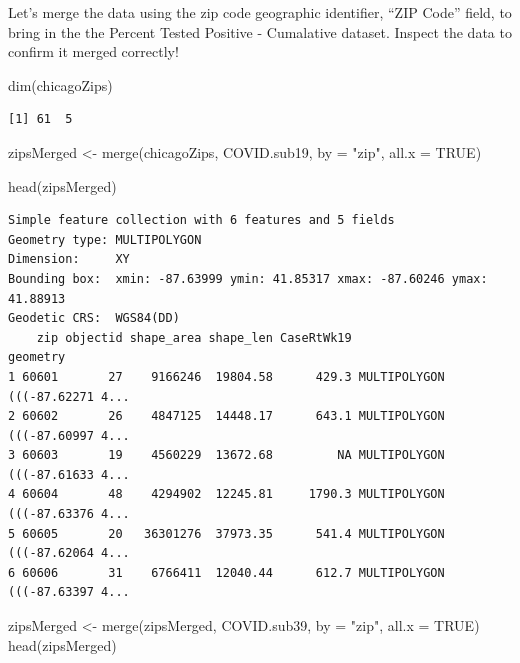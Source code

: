 \documentclass[
  letterpaper,
  DIV=11,
  numbers=noendperiod]{scrreprt}
\newenvironment{Shaded}{\begin{snugshade}}{\end{snugshade}}
\newcommand{\AttributeTok}[1]{\textcolor[rgb]{0.40,0.45,0.13}{#1}}
\newcommand{\ConstantTok}[1]{\textcolor[rgb]{0.56,0.35,0.01}{#1}}
\newcommand{\FunctionTok}[1]{\textcolor[rgb]{0.28,0.35,0.67}{#1}}
\newcommand{\NormalTok}[1]{\textcolor[rgb]{0.00,0.23,0.31}{#1}}
\newcommand{\OtherTok}[1]{\textcolor[rgb]{0.00,0.23,0.31}{#1}}
\newcommand{\StringTok}[1]{\textcolor[rgb]{0.13,0.47,0.30}{#1}}
\begin{document}
Let's merge the data using the zip code geographic identifier, ``ZIP
Code'' field, to bring in the the Percent Tested Positive - Cumalative
dataset. Inspect the data to confirm it merged correctly!

\begin{Shaded}
\begin{Highlighting}[]
\FunctionTok{dim}\NormalTok{(chicagoZips)}
\end{Highlighting}
\end{Shaded}

\begin{verbatim}
[1] 61  5
\end{verbatim}

\begin{Shaded}
\begin{Highlighting}[]
\NormalTok{zipsMerged }\OtherTok{\textless{}{-}} \FunctionTok{merge}\NormalTok{(chicagoZips, COVID.sub19, }\AttributeTok{by =} \StringTok{"zip"}\NormalTok{, }\AttributeTok{all.x =} \ConstantTok{TRUE}\NormalTok{)}

\FunctionTok{head}\NormalTok{(zipsMerged)}
\end{Highlighting}
\end{Shaded}

\begin{verbatim}
Simple feature collection with 6 features and 5 fields
Geometry type: MULTIPOLYGON
Dimension:     XY
Bounding box:  xmin: -87.63999 ymin: 41.85317 xmax: -87.60246 ymax: 41.88913
Geodetic CRS:  WGS84(DD)
    zip objectid shape_area shape_len CaseRtWk19                       geometry
1 60601       27    9166246  19804.58      429.3 MULTIPOLYGON (((-87.62271 4...
2 60602       26    4847125  14448.17      643.1 MULTIPOLYGON (((-87.60997 4...
3 60603       19    4560229  13672.68         NA MULTIPOLYGON (((-87.61633 4...
4 60604       48    4294902  12245.81     1790.3 MULTIPOLYGON (((-87.63376 4...
5 60605       20   36301276  37973.35      541.4 MULTIPOLYGON (((-87.62064 4...
6 60606       31    6766411  12040.44      612.7 MULTIPOLYGON (((-87.63397 4...
\end{verbatim}

\begin{Shaded}
\begin{Highlighting}[]
\NormalTok{zipsMerged }\OtherTok{\textless{}{-}} \FunctionTok{merge}\NormalTok{(zipsMerged, COVID.sub39, }\AttributeTok{by =} \StringTok{"zip"}\NormalTok{, }\AttributeTok{all.x =} \ConstantTok{TRUE}\NormalTok{)}
\FunctionTok{head}\NormalTok{(zipsMerged)}
\end{Highlighting}
\end{Shaded}
\end{document}
